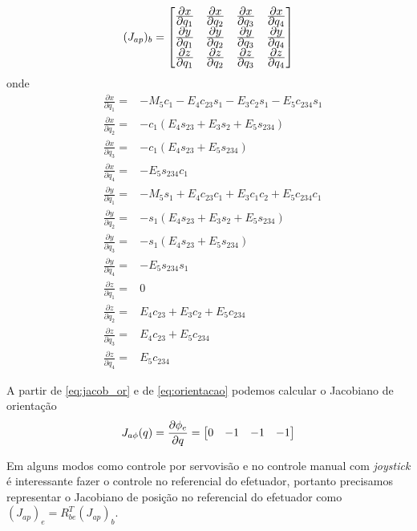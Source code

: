 \begin{equation}
({J}_{ap})_b = 
\begin{bmatrix}
	\frac{\displaystyle \partial x}{\displaystyle \partial q_1} & \frac{\displaystyle \partial x}{\displaystyle \partial q_2} & \frac{\displaystyle \partial x}{\displaystyle \partial q_3} & \frac{\displaystyle \partial x}{\displaystyle \partial q_4}  \\
	\frac{\displaystyle \partial y}{\displaystyle \partial q_1} & \frac{\displaystyle \partial y}{\displaystyle \partial q_2} & \frac{\displaystyle \partial y}{\displaystyle \partial q_3} & \frac{\displaystyle \partial y}{\displaystyle \partial q_4}  \\
	\frac{\displaystyle \partial z}{\displaystyle \partial q_1} & \frac{\displaystyle \partial z}{\displaystyle \partial q_2} & \frac{\displaystyle \partial z}{\displaystyle \partial q_3} & \frac{\displaystyle \partial z}{\displaystyle \partial q_4}  \\
\end{bmatrix}
\end{equation}
onde
\allowdisplaybreaks
\begin{align*}
&\frac{\partial x}{\partial q_1} =& - M_5c_1 - E_4c_{23}s_1 - E_3c_2s_1 - E_5c_{234}s_1  \\
&\frac{\partial x}{\partial q_2} =& -c_1(E_4s_{23}+E_3s_2+E_5s_{234}) \\
&\frac{\partial x}{\partial q_3} =& -c_1(E_4s_{23}+E_5s_{234}) \\
&\frac{\partial x}{\partial q_4} =& -E_5s_{234}c_1 \\
&\frac{\partial y}{\partial q_1} =& -M_5s_1+E_4c_{23}c_1+E_3c_1c_2+E_5c_{234}c_1 \\
&\frac{\partial y}{\partial q_2} =& -s_1(E_4s_{23}+E_3s_2+E_5s_{234}) \\
&\frac{\partial y}{\partial q_3} =& -s_1(E_4s_{23}+E_5s_{234}) \\
&\frac{\partial y}{\partial q_4} =& -E_5s_{234}s_1 \\ 
&\frac{\partial z}{\partial q_1} =& 0 \\ 
&\frac{\partial z}{\partial q_2} =& E_4c_{23}+E_3c_2+E_5c_{234} \\
&\frac{\partial z}{\partial q_3} =& E_4c_{23}+E_5c_{234}\\
&\frac{\partial z}{\partial q_4} =& E_{5}c_{234} 
\end{align*}

A partir de \ref{eq:jacob_or} e de \ref{eq:orientacao} podemos calcular o Jacobiano de orientação
\begin{equation}
{J}_{a\phi}({q}) = \frac{\partial \phi_e}{\partial {q}} = \begin{bmatrix}0 & -1 & -1 & -1\end{bmatrix}
\end{equation}
 
Em alguns modos como controle por servovisão e no controle manual com \textit{joystick} é interessante fazer o controle no referencial do efetuador, portanto precisamos representar o Jacobiano de posição no referencial do efetuador como $({J}_{ap})_e = {R}_{be}^T ({J}_{ap})_b$.  

